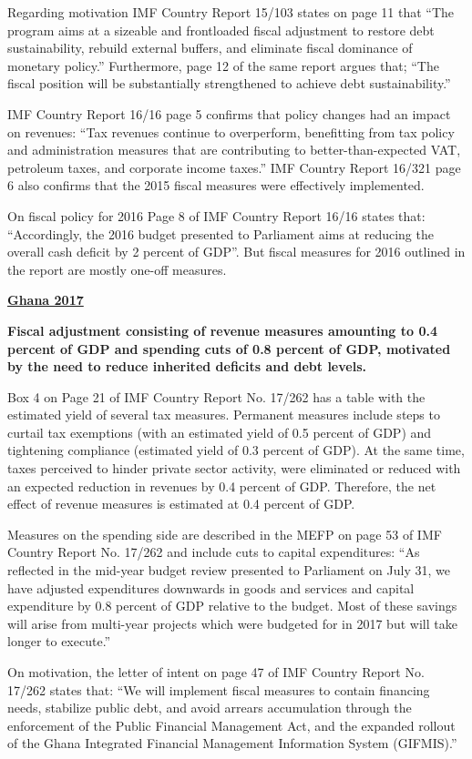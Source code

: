 Regarding motivation IMF Country Report 15/103 states on page 11 that “The program aims at a sizeable and frontloaded fiscal adjustment to restore debt sustainability, rebuild external buffers, and eliminate fiscal dominance of monetary policy.” Furthermore, page 12 of the same report argues that; “The fiscal position will be substantially strengthened to achieve debt sustainability.”

IMF Country Report 16/16 page 5 confirms that policy changes had an impact on revenues: “Tax revenues continue to overperform, benefitting from tax policy and administration measures that are contributing to better-than-expected VAT, petroleum taxes, and corporate income taxes.” IMF Country Report 16/321 page 6 also confirms that the 2015 fiscal measures were effectively implemented. 

On fiscal policy for 2016 Page 8 of IMF Country Report 16/16 states that: “Accordingly, the 2016 budget presented to Parliament aims at reducing the overall cash deficit by 2 percent of GDP”. But fiscal measures for 2016 outlined in the report are mostly one-off measures.

\textbf{\underline{Ghana 2017}}

\textbf{Fiscal adjustment consisting of revenue measures amounting to 0.4 percent of GDP and spending cuts of 0.8 percent of GDP, motivated by the need to reduce inherited deficits and debt levels.}

Box 4 on Page 21 of IMF Country Report No. 17/262 has a table with the estimated yield of several tax measures. Permanent measures include steps to curtail tax exemptions (with an estimated yield of 0.5 percent of GDP) and tightening compliance (estimated yield of 0.3 percent of GDP). At the same time, taxes perceived to hinder private sector activity, were eliminated or reduced with an expected reduction in revenues by 0.4 percent of GDP. Therefore, the net effect of revenue measures is estimated at 0.4 percent of GDP. 

Measures on the spending side are described in the MEFP on page 53 of IMF Country Report No. 17/262 and include cuts to capital expenditures: “As reflected in the mid-year budget review presented to Parliament on July 31, we have adjusted expenditures downwards in goods and services and capital expenditure by 0.8 percent of GDP relative to the budget. Most of these savings will arise from multi-year projects which were budgeted for in 2017 but will take longer to execute.”

On motivation, the letter of intent on page 47 of IMF Country Report No. 17/262 states that: “We will implement fiscal measures to contain financing needs, stabilize public debt, and avoid arrears accumulation through the enforcement of the Public Financial Management Act, and the expanded rollout of the Ghana Integrated Financial Management Information System (GIFMIS).”

